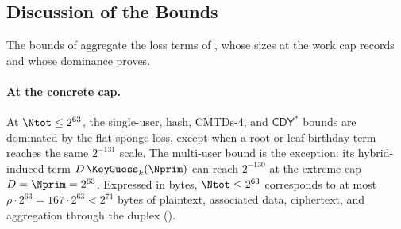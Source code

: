 \subsection{Discussion of the Bounds}
\label{sec:bound-discussion}

The bounds of  aggregate the loss terms of
, whose sizes at the work cap
 records and whose dominance
 proves.

\paragraph{At the concrete cap.}
At $\Ntot \leq 2^{63}$, the single-user, hash, CMTDs-4, and
$\mathsf{CDY}^\ast$ bounds are dominated by the flat sponge loss, except
when a root or leaf birthday term reaches the same $2^{-131}$ scale. The
multi-user bound is the exception: its hybrid-induced term
$D\,\KeyGuess_k(\Nprim)$ can reach $2^{-130}$ at the extreme cap
$D=\Nprim=2^{63}$. Expressed in bytes, $\Ntot \leq 2^{63}$ corresponds to
at most $\rho \cdot 2^{63} = 167 \cdot 2^{63} < 2^{71}$ bytes of
plaintext, associated data, ciphertext, and aggregation through the
duplex ().

